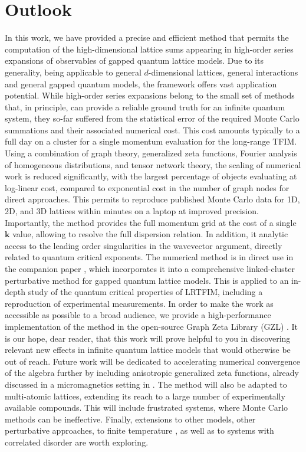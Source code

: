 \documentclass[]{amsart}
\numberwithin{mythm}{section}
\begin{document}
\section{Outlook}
\label{sec:outlook}

In this work, we have provided a precise and efficient method that permits the computation of the high-dimensional lattice sums appearing in high-order series expansions of observables of gapped quantum lattice models. Due to its generality, being applicable to general $d$-dimensional lattices, general interactions and general gapped quantum models, the framework offers vast application potential. While high-order series expansions belong to the small set of methods that, in principle, can provide a reliable ground truth for an infinite quantum system, they so-far suffered from the statistical error of the required Monte Carlo summations and their associated numerical cost. This cost amounts typically to a full day on a cluster for a single momentum evaluation for the long-range TFIM. Using a combination of graph theory, generalized zeta functions, Fourier analysis of homogeneous distributions, and tensor network theory, the scaling of numerical work is reduced significantly, with the largest percentage of objects evaluating at log-linear cost, compared to exponential cost in the number of graph nodes for direct approaches. This permits to reproduce published Monte Carlo data for 1D, 2D, and 3D lattices within minutes on a laptop at improved precision. Importantly, the method provides the full momentum grid at the cost of a single $\bm k$ value, allowing to resolve the full dispersion relation. In addition, it analytic access to the leading order singularities in the wavevector argument, directly related to quantum critical exponents. The numerical method is in direct use in the companion paper \cite{duft2026}, which incorporates it into a comprehensive linked-cluster perturbative method for gapped quantum lattice models. This is applied to an in-depth study of the quantum critical properties of LRTFIM, including a reproduction of experimental measurements. In order to make the work as accessible as possible to a broad audience, we provide a high-performance implementation of the method in the open-source Graph Zeta Library (GZL) \cite{gzl2026}. It is our hope, dear reader, that this work will prove helpful to you in discovering relevant new effects in infinite quantum lattice models that would otherwise be out of reach. Future work will be dedicated to accelerating numerical convergence of the algebra further by including anisotropic generalized zeta functions, already discussed in a micromagnetics setting in \cite{buchheit2026zeta}. The method will also be adapted to multi-atomic lattices, extending its reach to a large number of experimentally available compounds. This will include frustrated systems, where Monte Carlo methods can be ineffective. Finally, extensions to other models, other perturbative approaches, to finite temperature \cite{Burkard2026A,Burkard2026B}, as well as to systems with correlated disorder are worth exploring.
\end{document}
